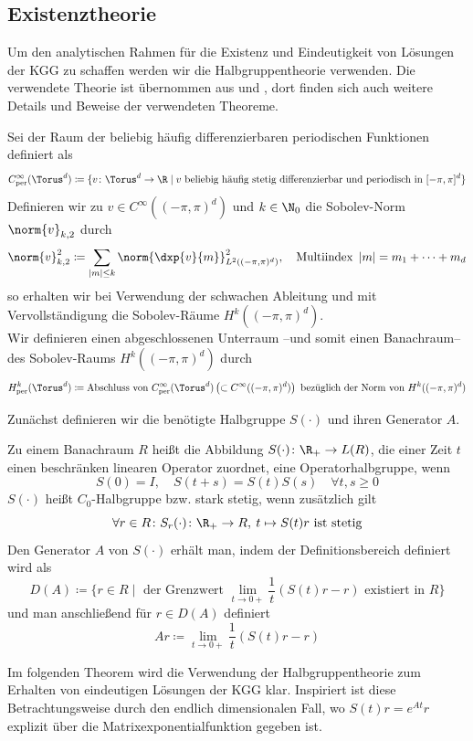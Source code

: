\subsection{Existenztheorie}
Um den analytischen Rahmen für die Existenz und Eindeutigkeit von Lösungen der KGG zu schaffen werden wir die Halbgruppentheorie verwenden. Die verwendete Theorie ist übernommen aus \autocite{HundSchnau} und \autocite{EngelNagel}, dort finden sich auch weitere Details und Beweise der verwendeten Theoreme.
\begin{mathdef}
Sei der Raum der beliebig häufig differenzierbaren periodischen Funktionen definiert als
\[C_\text{per}^\infty (\Torus^d)\coloneqq \lbrace v\colon \Torus^d\to\R \mid v \text{ beliebig häufig stetig differenzierbar und periodisch in }[-\pi,\pi]^d\rbrace\]
Definieren wir zu $v\in C^\infty((-\pi,\pi)^d)$ und $k\in\N_0$ die Sobolev-Norm $\norm{v}_{k,2}$ durch
\[\norm{v}_{k,2}^2\coloneqq \sum_{|m|\le k}\norm{\dxp{v}{m}}_{L^2((-\pi,\pi)^d)}^2,\quad \text{Multiindex }\, |m|=m_1+\dots + m_d\]
so erhalten wir bei Verwendung der schwachen Ableitung und mit Vervollständigung die Sobolev-Räume $H^k((-\pi,\pi)^d)$.\\
Wir definieren einen abgeschlossenen Unterraum --und somit einen Banachraum-- des Sobolev-Raums $H^k((-\pi,\pi)^d)$ durch
\[H_\text{per}^k(\Torus^d)\coloneqq \text{Abschluss von } C_\text{per}^\infty(\Torus^d)\left(\subset C^\infty((-\pi,\pi)^d)\right) \text{ bezüglich der Norm von } H^k((-\pi,\pi)^d)\]
\end{mathdef}
Zunächst definieren wir die benötigte Halbgruppe $S(\cdot)$ und ihren Generator $A$.
\begin{mathdef}
Zu einem Banachraum $R$ heißt die Abbildung $S(\cdot)\colon \R_+\to L(R)$, die einer Zeit $t$ einen beschränken linearen Operator zuordnet, eine Operatorhalbgruppe, wenn
\[S(0)=I,\quad S(t+s)=S(t)S(s)\quad \forall t,s\ge 0\]
$S(\cdot)$ heißt $C_0$-Halbgruppe bzw. stark stetig, wenn zusätzlich gilt
\[\forall r\in R\colon S_r(\cdot)\colon \R_+\to R,\: t\mapsto S(t)r \text{ ist stetig}\]
Den Generator $A$ von $S(\cdot)$ erhält man, indem der Definitionsbereich definiert wird als
\[D(A)\coloneqq \lbrace r\in R\mid \text{ der Grenzwert } \lim\limits_{t\to0+}\frac{1}{t}(S(t)r-r)\text { existiert in }R\rbrace\]
und man anschließend für $r\in D(A)$ definiert
\[Ar\coloneqq \lim\limits_{t\to0+}\frac{1}{t}(S(t)r-r)\]
\end{mathdef}
Im folgenden Theorem wird die Verwendung der Halbgruppentheorie zum Erhalten von eindeutigen Lösungen der KGG klar. Inspiriert ist diese Betrachtungsweise durch den endlich dimensionalen Fall, wo $S(t)r=e^{At}r$ explizit über die Matrixexponentialfunktion gegeben ist.
